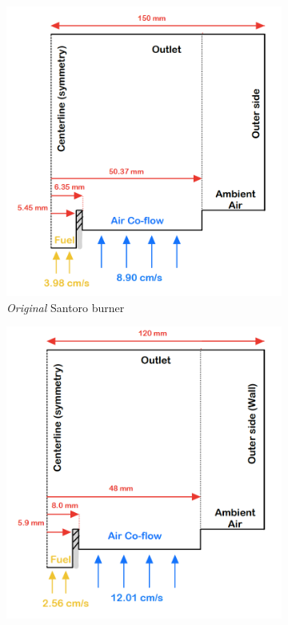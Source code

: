 \documentclass[12pt]{CHT-20}
\begin{document}
\begin{figure}[H]
     \centering
     \begin{subfigure}[b]{0.49\textwidth}
         \centering
         \includegraphics[width=\textwidth]{figures/meshes/SantoroBurnerLiterature_meshDiagram_wMeas.png}
         \caption{\emph{Original} Santoro burner}
     \end{subfigure}
     \hfill
     \begin{subfigure}[b]{0.48\textwidth}
         \centering
         \includegraphics[width=\textwidth]{figures/meshes/fmGlobal_meshDiagram_fuelNozzleMeas.png}

\end{subfigure}
\end{figure}
\end{document}
